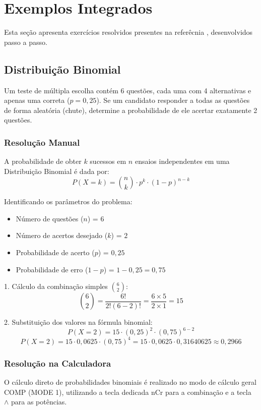 \chapter{Exemplos Integrados}

Esta seção apresenta exercícios resolvidos presentes na referêcnia \cite{crespo2009}, desenvolvidos passo a passo.

\section{Distribuição Binomial}

Um teste de múltipla escolha contém 6 questões, cada uma com 4 alternativas e apenas uma correta ($p = 0{,}25$). Se um candidato responder a todas as questões de forma aleatória (chute), determine a probabilidade de ele acertar exatamente 2 questões.

\subsection*{Resolução Manual}

A probabilidade de obter $k$ sucessos em $n$ ensaios independentes em uma Distribuição Binomial é dada por:
\[
P(X = k) = \binom{n}{k} \cdot p^k \cdot (1-p)^{n-k}
\]

Identificando os parâmetros do problema:
\begin{itemize}
    \item Número de questões ($n$) = $6$
    \item Número de acertos desejado ($k$) = $2$
    \item Probabilidade de acerto ($p$) = $0{,}25$
    \item Probabilidade de erro ($1-p$) = $1 - 0{,}25 = 0{,}75$
\end{itemize}

1. Cálculo da combinação simples $\binom{6}{2}$:
\[
\binom{6}{2} = \frac{6!}{2!(6-2)!} = \frac{6 \times 5}{2 \times 1} = 15
\]

2. Substituição dos valores na fórmula binomial:
\[
P(X = 2) = 15 \cdot (0{,}25)^2 \cdot (0{,}75)^{6-2}
\]
\[
P(X = 2) = 15 \cdot 0{,}0625 \cdot (0{,}75)^4 = 15 \cdot 0{,}0625 \cdot 0{,}31640625 \approx 0{,}2966
\]

\subsection*{Resolução na Calculadora}

O cálculo direto de probabilidades binomiais é realizado no modo de cálculo geral COMP (MODE 1), utilizando a tecla dedicada nCr para a combinação e a tecla \textbf{$\wedge$} para as potências.


